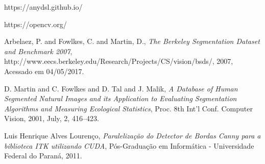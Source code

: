 \documentclass{article}
\begin{document}
\begin{thebibliography}{4}

  https://anydsl.github.io/

  https://opencv.org/

   Arbelaez, P. and Fowlkes, C. and Martin, D.,
   \textit{The Berkeley Segmentation Dataset and Benchmark 2007},
   http://www.eecs.berkeley.edu/Research/Projects/CS/vision/bsds/,
   2007,
   Acessado em 04/05/2017.

  D. Martin and C. Fowlkes and D. Tal and J. Malik,
  \textit{A Database of Human Segmented Natural Images and its 
           Application to Evaluating Segmentation Algorithms and 
           Measuring Ecological Statistics},
  Proc. 8th Int'l Conf. Computer Vision,
  2001,
  July,
  2,
  416--423.

   Luis Henrique Alves Lourenço,
   \textit{Paralelização do Detector de Bordas Canny para a biblioteca ITK utilizando CUDA},
   Pós-Graduação em Informática - Universidade Federal do Paraná, 
   2011.

\end{thebibliography}
\end{document}
